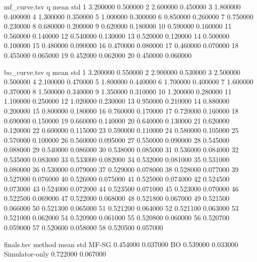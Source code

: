 \begin{filecontents*}{mf_curve.tsv}
q	mean	std
1	3.200000	0.500000
2	2.600000	0.450000
3	1.800000	0.400000
4	1.300000	0.350000
5	1.000000	0.300000
6	0.850000	0.260000
7	0.750000	0.230000
8	0.680000	0.200000
9	0.620000	0.180000
10	0.590000	0.160000
11	0.560000	0.140000
12	0.540000	0.130000
13	0.520000	0.120000
14	0.500000	0.100000
15	0.480000	0.090000
16	0.470000	0.080000
17	0.460000	0.070000
18	0.455000	0.065000
19	0.452000	0.062000
20	0.450000	0.060000
\end{filecontents*}

\begin{filecontents*}{bo_curve.tsv}
q	mean	std
1	3.200000	0.550000
2	2.900000	0.530000
3	2.500000	0.500000
4	2.100000	0.470000
5	1.800000	0.440000
6	1.700000	0.400000
7	1.600000	0.370000
8	1.500000	0.340000
9	1.350000	0.310000
10	1.200000	0.280000
11	1.100000	0.250000
12	1.020000	0.230000
13	0.950000	0.210000
14	0.880000	0.200000
15	0.800000	0.180000
16	0.760000	0.170000
17	0.720000	0.160000
18	0.690000	0.150000
19	0.660000	0.140000
20	0.640000	0.130000
21	0.620000	0.120000
22	0.600000	0.115000
23	0.590000	0.110000
24	0.580000	0.105000
25	0.570000	0.100000
26	0.560000	0.095000
27	0.550000	0.090000
28	0.545000	0.088000
29	0.540000	0.086000
30	0.538000	0.085000
31	0.536000	0.084000
32	0.535000	0.083000
33	0.533000	0.082000
34	0.532000	0.081000
35	0.531000	0.080000
36	0.530000	0.079000
37	0.529000	0.078000
38	0.528000	0.077000
39	0.527000	0.076000
40	0.526000	0.075000
41	0.525000	0.074000
42	0.524500	0.073000
43	0.524000	0.072000
44	0.523500	0.071000
45	0.523000	0.070000
46	0.522500	0.069000
47	0.522000	0.068000
48	0.521800	0.067000
49	0.521500	0.066000
50	0.521300	0.065000
51	0.521200	0.064000
52	0.521100	0.063000
53	0.521000	0.062000
54	0.520900	0.061000
55	0.520800	0.060000
56	0.520700	0.059000
57	0.520600	0.058000
58	0.520500	0.057000
\end{filecontents*}

\begin{filecontents*}{finals.tsv}
method	mean	std
MF-SG	0.454000	0.037000
BO	0.539000	0.033000
Simulator-only	0.722000	0.067000
\end{filecontents*}

\documentclass[11pt]{article}
\usepackage[margin=1in]{geometry}
\usepackage{graphicx}
\usepackage{booktabs}
\usepackage{adjustbox}
\usepackage{amsmath,amssymb}
\usepackage{siunitx}
\usepackage{tikz}
\usepackage{pgfplots}
\usepackage{pgfplotstable}
\usepackage[numbers,sort&compress]{natbib}
\usepackage[ruled,vlined]{algorithm2e}
\usepackage[hidelinks]{hyperref}
\pgfplotsset{compat=1.17}

